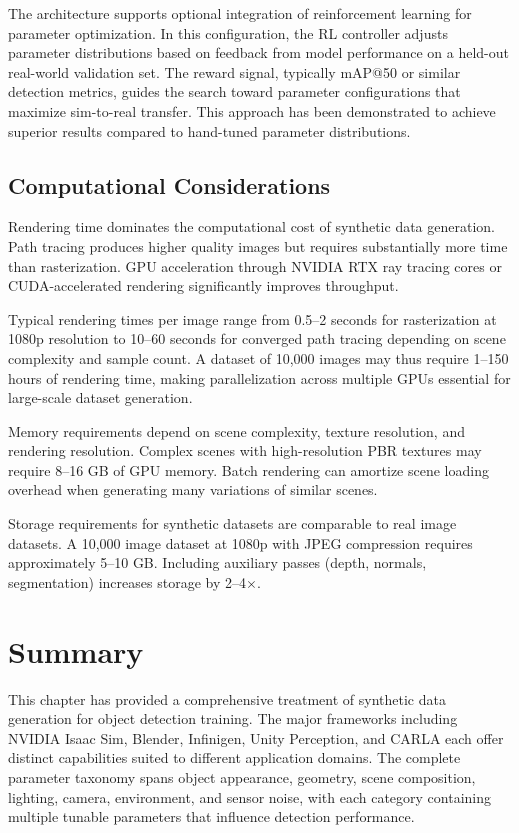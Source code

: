 The architecture supports optional integration of reinforcement learning for parameter optimization. In this configuration, the RL controller adjusts parameter distributions based on feedback from model performance on a held-out real-world validation set. The reward signal, typically mAP@50 or similar detection metrics, guides the search toward parameter configurations that maximize sim-to-real transfer. This approach has been demonstrated to achieve superior results compared to hand-tuned parameter distributions.

\subsection{Computational Considerations}

Rendering time dominates the computational cost of synthetic data generation. Path tracing produces higher quality images but requires substantially more time than rasterization. GPU acceleration through NVIDIA RTX ray tracing cores or CUDA-accelerated rendering significantly improves throughput.

Typical rendering times per image range from 0.5--2 seconds for rasterization at 1080p resolution to 10--60 seconds for converged path tracing depending on scene complexity and sample count. A dataset of 10,000 images may thus require 1--150 hours of rendering time, making parallelization across multiple GPUs essential for large-scale dataset generation.

Memory requirements depend on scene complexity, texture resolution, and rendering resolution. Complex scenes with high-resolution PBR textures may require 8--16 GB of GPU memory. Batch rendering can amortize scene loading overhead when generating many variations of similar scenes.

Storage requirements for synthetic datasets are comparable to real image datasets. A 10,000 image dataset at 1080p with JPEG compression requires approximately 5--10 GB. Including auxiliary passes (depth, normals, segmentation) increases storage by 2--4$\times$.

\section{Summary}

This chapter has provided a comprehensive treatment of synthetic data generation for object detection training. The major frameworks including NVIDIA Isaac Sim, Blender, Infinigen, Unity Perception, and CARLA each offer distinct capabilities suited to different application domains. The complete parameter taxonomy spans object appearance, geometry, scene composition, lighting, camera, environment, and sensor noise, with each category containing multiple tunable parameters that influence detection performance.

